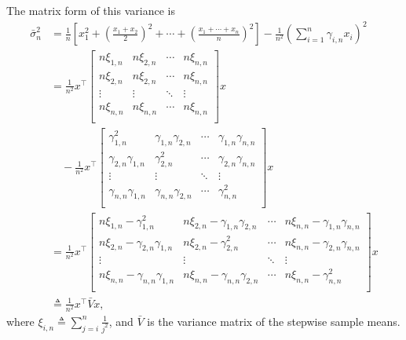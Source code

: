 \documentclass{article}
\begin{document}
The matrix form of this variance is
\begin{equation}
  \begin{aligned}
    \bar{\sigma}_n^2
    &=\frac{1}{n}\left[x_1^2+\left(\frac{x_1+x_2}{2}\right)^2+\cdots+\left(\frac{x_1+\cdots+x_n}{n}\right)^2\right] - \frac{1}{n^2}\left(\sum_{i=1}^n\gamma_{i,n}x_i\right)^2\\
    &=\frac{1}{n^2}x^\top\begin{bmatrix}
      n\xi_{1,n} & n\xi_{2,n} & \cdots & n\xi_{n,n} \\
      n\xi_{2,n} & n\xi_{2,n} & \cdots & n\xi_{n,n} \\
      \vdots & \vdots & \ddots & \vdots \\
      n\xi_{n,n} & n\xi_{n,n} & \cdots & n\xi_{n,n} \\
    \end{bmatrix}x\\
    &\quad
    -\frac{1}{n^2}x^\top\begin{bmatrix}
      \gamma_{1,n}^2 & \gamma_{1,n}\gamma_{2,n} & \cdots & \gamma_{1,n}\gamma_{n,n} \\
      \gamma_{2,n}\gamma_{1,n} & \gamma_{2,n}^2 & \cdots & \gamma_{2,n}\gamma_{n,n} \\
      \vdots & \vdots & \ddots & \vdots \\
      \gamma_{n,n}\gamma_{1,n} & \gamma_{n,n}\gamma_{2,n} & \cdots & \gamma_{n,n}^2 \\
    \end{bmatrix}x\\
    &=\frac{1}{n^2}x^\top\begin{bmatrix}
      n\xi_{1,n}-\gamma_{1,n}^2 & n\xi_{2,n}-\gamma_{1,n}\gamma_{2,n} & \cdots & n\xi_{n,n}-\gamma_{1,n}\gamma_{n,n} \\
      n\xi_{2,n}-\gamma_{2,n}\gamma_{1,n} & n\xi_{2,n}-\gamma_{2,n}^2 & \cdots & n\xi_{n,n}-\gamma_{2,n}\gamma_{n,n} \\
      \vdots & \vdots & \ddots & \vdots \\
      n\xi_{n,n}-\gamma_{n,n}\gamma_{1,n} & n\xi_{n,n}-\gamma_{n,n}\gamma_{2,n} & \cdots & n\xi_{n,n}-\gamma_{n,n}^2 \\
    \end{bmatrix}x\\
    &\triangleq\frac{1}{n^2}x^\top\bar{V}x,
  \end{aligned}
\end{equation}
where $\xi_{i,n}\triangleq\sum_{j=i}^n\frac{1}{j^2}$, and $\bar{V}$ is the variance matrix of the stepwise sample means.
\end{document}
